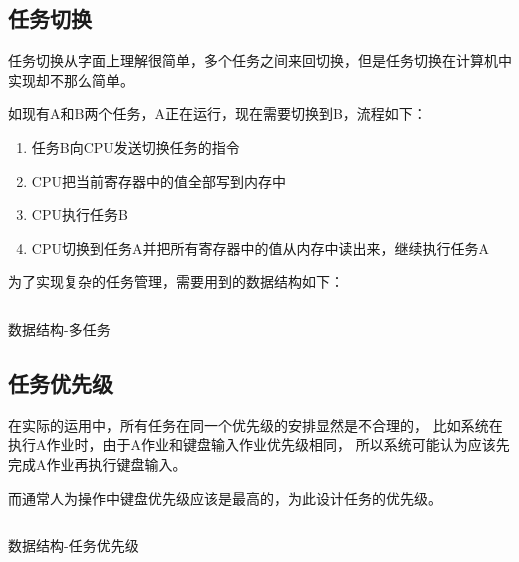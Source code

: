 \subsection{任务切换}

任务切换从字面上理解很简单，多个任务之间来回切换，但是任务切换在计算机中实现却不那么简单。

如现有A和B两个任务，A正在运行，现在需要切换到B，流程如下：
\begin{enumerate}
\item 任务B向CPU发送切换任务的指令
\item CPU把当前寄存器中的值全部写到内存中
\item CPU执行任务B
\item CPU切换到任务A并把所有寄存器中的值从内存中读出来，继续执行任务A
\end{enumerate}
为了实现复杂的任务管理，需要用到的数据结构如下：
\begin{listing}[H]
  \inputminted[tabsize=2, firstline=227, lastline=232,
  linenos=true]{c}{../ZOS/src/kernel/bootpack.h}
  \caption{数据结构-多任务}
  \label{lst:multi_task}
\end{listing}

\subsection{任务优先级}

在实际的运用中，所有任务在同一个优先级的安排显然是不合理的，
比如系统在执行A作业时，由于A作业和键盘输入作业优先级相同，
所以系统可能认为应该先完成A作业再执行键盘输入。

而通常人为操作中键盘优先级应该是最高的，为此设计任务的优先级。

\begin{listing}[H]
  \inputminted[tabsize=2, firstline=222, lastline=226,
  linenos=true]{c}{../ZOS/src/kernel/bootpack.h}
  \caption{数据结构-任务优先级}
  \label{lst:task_level}
\end{listing}

% 
% 
% 